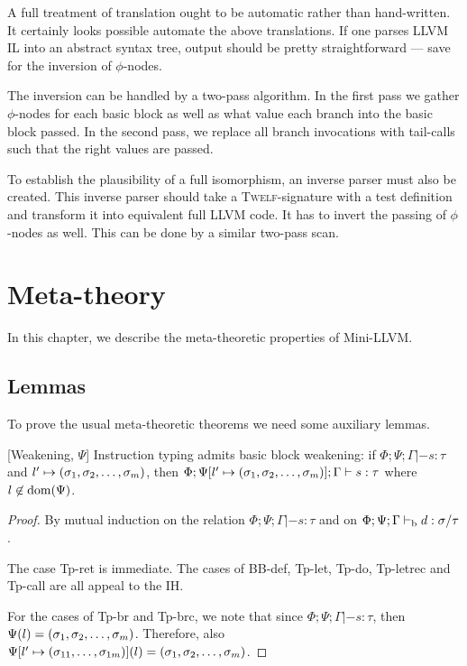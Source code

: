 \documentclass[a4paper, oneside, 10pt, draft]{memoir}
\newcommand{\twelf}{\textsc{Twelf}}
\begin{document}
A full treatment of translation ought to be automatic rather than
hand-written. It certainly looks possible automate the above
translations. If one parses LLVM IL into an abstract syntax tree,
output should be pretty straightforward --- save for the inversion of
$\phi$-nodes.

The inversion can be handled by a two-pass algorithm. In the first
pass we gather $\phi$-nodes for each basic block as well as what value
each branch into the basic block passed. In the second pass, we
replace all branch invocations with tail-calls such that the right
values are passed.

To establish the plausibility of a full isomorphism, an inverse parser
must also be created. This inverse parser should take a
\twelf{}-signature with a test definition and transform it into
equivalent full LLVM code. It has to invert the passing of
$\phi$-nodes as well. This can be done by a similar two-pass scan.

\chapter{Meta-theory}

In this chapter, we describe the meta-theoretic properties of
Mini-LLVM.

\section{Lemmas}

To prove the usual meta-theoretic theorems we need some auxiliary
lemmas.

\begin{lem}{[Weakening, $\Psi$]}
  \label{lem:weaken-psi}
  Instruction typing admits basic block weakening: if $\Phi;\Psi;\Gamma
  |- s : \tau$ and $l' \mapsto (\sigma_1, \sigma_2, \dotsc, \sigma_m)$, then $\Phi;\Psi[l' \mapsto
  (\sigma_1, \sigma_2, \dotsc, \sigma_m)];\Gamma |- s : \tau$ where $l \not \in \mathrm{dom}(\Psi)$.
\end{lem}
\begin{proof}
  By mutual induction on the relation $\Phi;\Psi;\Gamma |- s : \tau$
  and on $\Phi;\Psi;\Gamma |-_{\mathrm{b}} d : \sigma / \tau$.

  The case Tp-ret is immediate. The cases of BB-def, Tp-let, Tp-do,
  Tp-letrec and Tp-call are all appeal to the IH.

  For the cases of Tp-br and Tp-brc, we note that since
  $\Phi;\Psi;\Gamma |- s : \tau$, then $\Psi(l) =
  (\sigma_1, \sigma_2, \dotsc, \sigma_m)$. Therefore, also $\Psi[l' \mapsto (\sigma_{11}, \dotsc,
  \sigma_{1m})](l) = (\sigma_1, \sigma_2, \dotsc, \sigma_m)$.
\end{proof}
\end{document}
